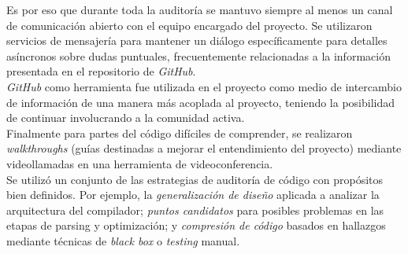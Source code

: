 Es por eso que durante toda la auditoría se mantuvo siempre al menos un canal de comunicación abierto con el equipo encargado del proyecto. Se utilizaron servicios de mensajería\cite{GitterLink} para mantener un diálogo específicamente para detalles asíncronos sobre dudas puntuales, frecuentemente relacionadas a la información presentada en el repositorio de \textit{GitHub}.\\

\textit{GitHub} como herramienta fue utilizada en el proyecto como medio de intercambio de información de una manera más acoplada al proyecto, teniendo la posibilidad de continuar involucrando a la comunidad activa.\\

Finalmente para partes del código difíciles de comprender, se realizaron \textit{walkthroughs} (guías destinadas a mejorar el entendimiento del proyecto) mediante videollamadas en una herramienta de videoconferencia\cite{MeetLink}.\\ 

Se utilizó un conjunto de las estrategias de auditoría de código con propósitos bien definidos. Por ejemplo, la \textit{generalización de diseño} aplicada a analizar la arquitectura del compilador; \textit{puntos candidatos} para posibles problemas en las etapas de parsing y optimización; y \textit{compresión de código} basados en hallazgos mediante técnicas de \textit{black box} o \textit{testing} manual.\\

